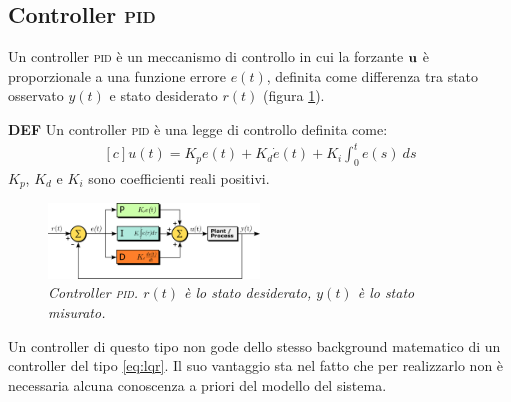 \subsection{Controller \textsc{pid}}\label{subsec:intro-pid}
Un controller \textsc{pid} è un meccanismo di controllo in cui la forzante $\bf u$ è proporzionale a una funzione
errore $e(t)$, definita come differenza tra stato osservato $y(t)$ e stato desiderato $r(t)$ (figura \ref{fig:pid}).

\begin{framed}
  \textbf{DEF}
  Un controller \textsc{pid} è una legge di controllo definita come:
  \begin{equation}
    \begin{aligned}[c]
      u(t) = K_p e(t) + K_d \dot e(t) + K_i \int_0^t e(s)\ ds
    \end{aligned}
    \label{eq:pid}
  \end{equation}
  $K_p$, $K_d$ e $K_i$ sono coefficienti reali positivi.
\end{framed}


\begin{figure}[h]
  \includegraphics[width=0.5\textwidth]{../assets/diagramma pid.pdf}
  \caption{\emph{Controller \textsc{pid}. $r(t)$ è lo stato desiderato, $y(t)$ è lo stato misurato.}}
  \label{fig:pid}
\end{figure}

Un controller di questo tipo non gode dello stesso background matematico di un controller del tipo \eqref{eq:lqr}.
Il suo vantaggio sta nel fatto che per realizzarlo non è necessaria alcuna conoscenza a priori del modello del sistema.

